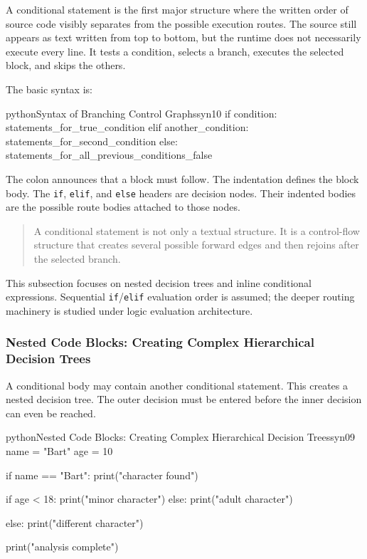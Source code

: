 \documentclass[a4paper,twoside]{report}
\begin{document}
A conditional statement is the first major structure where the written order of source code visibly separates from the possible execution routes. The source still appears as text written from top to bottom, but the runtime does not necessarily execute every line. It tests a condition, selects a branch, executes the selected block, and skips the others.

The basic syntax is:

\begin{codebox}[]{python}{Syntax of Branching Control Graphs}{syn10}
if condition:
    statements_for_true_condition
elif another_condition:
    statements_for_second_condition
else:
    statements_for_all_previous_conditions_false
\end{codebox}


The colon announces that a block must follow. The indentation defines the block body. The \texttt{if}, \texttt{elif}, and \texttt{else} headers are decision nodes. Their indented bodies are the possible route bodies attached to those nodes.

\begin{quote}
A conditional statement is not only a textual structure. It is a control-flow structure that creates several possible forward edges and then rejoins after the selected branch.
\end{quote}

This subsection focuses on nested decision trees and inline conditional expressions. Sequential \texttt{if}/\texttt{elif} evaluation order is assumed; the deeper routing machinery is studied under logic evaluation architecture.

\subsubsection{Nested Code Blocks: Creating Complex Hierarchical Decision Trees}

A conditional body may contain another conditional statement. This creates a nested decision tree. The outer decision must be entered before the inner decision can even be reached.

\begin{codebox}[]{python}{Nested Code Blocks: Creating Complex Hierarchical Decision Trees}{syn09}
name = "Bart"
age = 10

if name == "Bart":
    print("character found")

    if age < 18:
        print("minor character")
    else:
        print("adult character")

else:
    print("different character")

print("analysis complete")
\end{codebox}
\end{document}
